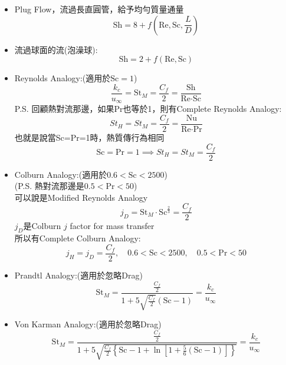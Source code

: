 \documentclass[../main.tex]{subfiles}
\begin{document}
\begin{itemize}
\begin{itemize}
  \begin{equation}
    \text{Sh} = \frac{48}{11} + f(\text{Re},\text{Sc},\frac{L}{D})
  \end{equation}
  \item Plug Flow，流過長直圓管，給予均勻質量通量
  \begin{equation}
    \text{Sh} = 8 + f(\text{Re},\text{Sc},\frac{L}{D})
  \end{equation}
  \item 流過球面的流(泡澡球):
  \begin{equation}
    \text{Sh} = 2 + f(\text{Re},\text{Sc})
  \end{equation}
  \item Reynolds Analogy:(適用於$\text{Sc}=1$)
  \begin{equation}
    \frac{k_c}{u_\infty} = \text{St}_M = \frac{C_f}{2} = \frac{\text{Sh}}{\text{Re}\cdot\text{Sc}}
  \end{equation}
  P.S. 回顧熱對流那邊，如果Pr也等於1，則有Complete Reynolds Analogy:
  \begin{equation}
    St_H = St_M = \frac{C_f}{2} = \frac{\text{Nu}}{\text{Re}\cdot\text{Pr}}
  \end{equation}
  也就是說當Sc=Pr=1時，熱質傳行為相同
  \begin{equation}
    \text{Sc} = \text{Pr} = 1 \implies St_H = St_M = \frac{C_f}{2}
  \end{equation}
  \item Colburn Analogy:(適用於$0.6<\text{Sc}<2500$)\\
   (P.S. 熱對流那邊是$0.5<\text{Pr}<50$)\\
   可以說是Modified Reynolds Analogy
  \begin{equation}
    j_D = \text{St}_M\cdot \text{Sc}^{\frac{2}{3}} = \frac{C_f}{2}
  \end{equation}
  $j_D$是Colburn $j$ factor for mass transfer\\
  所以有Complete Colburn Analogy:
  \begin{equation}
    j_H =  j_D = \frac{C_f}{2},\quad 0.6<\text{Sc}<2500,\quad 0.5<\text{Pr}<50
  \end{equation}
  \item Prandtl Analogy:(適用於忽略Drag)
  \begin{equation}
    \text{St}_M = \frac{\frac{C_f}{2}}{1+5\sqrt{\frac{C_f}{2}}\left(\text{Sc}-1\right)} = \frac{k_c}{u_\infty}
  \end{equation}
  \item Von Karman Analogy:(適用於忽略Drag)
  \begin{equation}
    \text{St}_M = \frac{\frac{C_f}{2}}{1+5\sqrt{\frac{C_f}{2}\left\{
      \text{Sc}-1+\ln\left[1+\frac{5}{6}\left(\text{Sc}-1\right)\right]
    \right\}}} = \frac{k_c}{u_\infty}
  \end{equation}
\end{itemize}
\end{itemize}
\end{document}
